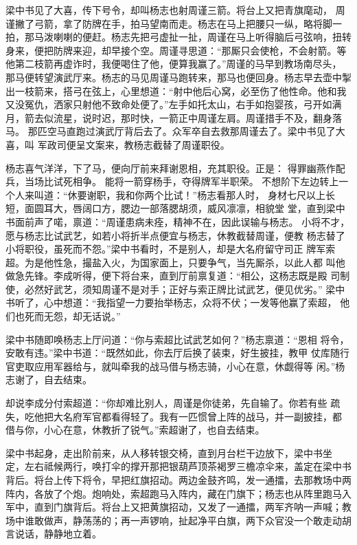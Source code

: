 梁中书见了大喜，传下号令，却叫杨志也射周谨三箭。将台上又把青旗麾动，
周谨撇了弓箭，拿了防牌在手，拍马望南而走。杨志在马上把腰只一纵，略将脚一
拍，那马泼喇喇的便赶。杨志先把弓虚扯一扯，周谨在马上听得脑后弓弦响，扭转
身来，便把防牌来迎，却早接个空。周谨寻思道：“那厮只会使枪，不会射箭。等
他第二枝箭再虚诈时，我便喝住了他，便算我赢了。”周谨的马早到教场南尽头，
那马便转望演武厅来。杨志的马见周谨马跑转来，那马也便回身。杨志早去壶中掣
出一枝箭来，搭弓在弦上，心里想道：“射中他后心窝，必至伤了他性命。他和我
又没冤仇，洒家只射他不致命处便了。”左手如托太山，右手如抱婴孩，弓开如满
月，箭去似流星，说时迟，那时快，一箭正中周谨左肩。周谨措手不及，翻身落马。
那匹空马直跑过演武厅背后去了。众军卒自去救那周谨去了。梁中书见了大喜，叫
军政司便呈文案来，教杨志截替了周谨职役。

杨志喜气洋洋，下了马，便向厅前来拜谢恩相，充其职役。正是：
得罪幽燕作配兵，当场比试死相争。
能将一箭穿杨手，夺得牌军半职荣。
不想阶下左边转上一个人来叫道：“休要谢职，我和你两个比试！”杨志看那人时，
身材七尺以上长短，面圆耳大，唇阔口方，腮边一部落腮胡须，威风凛凛，相貌堂
堂，直到梁中书面前声了喏，禀道：“周谨患病未痊，精神不在，因此误输与杨志。
小将不才，愿与杨志比试武艺，如若小将折半点便宜与杨志，休教截替周谨，便教
杨志替了小将职役，虽死而不怨。”梁中书看时，不是别人，却是大名府留守司正
牌军索超。为是他性急，撮盐入火，为国家面上，只要争气，当先厮杀，以此人都
叫他做急先锋。李成听得，便下将台来，直到厅前禀复道：“相公，这杨志既是殿
司制使，必然好武艺，须知周谨不是对手；正好与索正牌比试武艺，便见优劣。”
梁中书听了，心中想道：“我指望一力要抬举杨志，众将不伏；一发等他赢了索超，
他们也死而无怨，却无话说。”

梁中书随即唤杨志上厅问道：“你与索超比试武艺如何？”杨志禀道：“恩相
将令，安敢有违。”梁中书道：“既然如此，你去厅后换了装束，好生披挂，教甲
仗库随行官吏取应用军器给与，就叫牵我的战马借与杨志骑，小心在意，休觑得等
闲。”杨志谢了，自去结束。

却说李成分付索超道：“你却难比别人，周谨是你徒弟，先自输了。你若有些
疏失，吃他把大名府军官都看得轻了。我有一匹惯曾上阵的战马，并一副披挂，都
借与你，小心在意，休教折了锐气。”索超谢了，也自去结束。

梁中书起身，走出阶前来，从人移转银交椅，直到月台栏干边放下，梁中书坐
定，左右祗候两行，唤打伞的撑开那把银葫芦顶茶褐罗三檐凉伞来，盖定在梁中书
背后。将台上传下将令，早把红旗招动。两边金鼓齐鸣，发一通擂，去那教场中两
阵内，各放了个炮。炮响处，索超跑马入阵内，藏在门旗下；杨志也从阵里跑马入
军中，直到门旗背后。将台上又把黄旗招动，又发了一通擂，两军齐呐一声喊；教
场中谁敢做声，静荡荡的；再一声锣响，扯起净平白旗，两下众官没一个敢走动胡
言说话，静静地立着。

